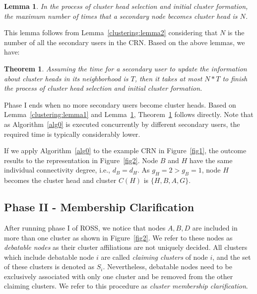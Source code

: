 \documentclass[times]{ettauth}
\theoremstyle{mytheoremstyle}
\newtheorem{theorem}{Theorem}[section]
\theoremstyle{mytheoremstyle}
\theoremstyle{mytheoremstyle}
\newtheorem{lemma}{Lemma}[section]
\begin{document}
\begin{lemma}
\label{clustering:lemma3}
In the process of cluster head selection and initial cluster formation, the maximum number of times that a secondary node becomes cluster head is $N$.
\end{lemma}
This lemma follows from Lemma~\ref{clustering:lemma2} considering that $N$ is the number of all the secondary users in the CRN.
Based on the above lemmas, we have:
\begin{theorem}
\label{clustering:theorem}
Assuming the time for a secondary user to update the information about cluster heads in its neighborhood is $T$, then it takes at most $N*T $ to finish the process of cluster head selection and initial cluster formation.
\end{theorem}
Phase I ends when no more secondary users become cluster heads.
Based on Lemma~\ref{clustering:lemma1} and Lemma~\ref{clustering:lemma3}, Theorem~\ref{clustering:theorem} follows directly.
Note that as Algorithm~\ref{alg0} is executed concurrently by different secondary users, the required time is typically considerably lower.

If we apply Algorithm~\ref{alg0} to the example CRN in Figure~\ref{fig1}, the outcome results to the representation in Figure~\ref{fig2}.
Node $B$ and $H$ have the same individual connectivity degree, i.e., $d_B=d_H$. As $g_H=2>g_B=1$, node $H$ becomes the cluster head and cluster $C(H)$ is $\{H, B, A, G\}$.


\subsection{Phase II - Membership Clarification}
\label{membershipClarification}
After running phase I of ROSS, we notice that nodes $A, B, D$ are included in more than one cluster as shown in Figure~\ref{fig2}. 
We refer to these nodes as \textit{debatable nodes} as their cluster affiliations are not uniquely decided.
All clusters which include debatable node $i$ are called \textit{claiming clusters} of node $i$, and the set of these clusters is denoted as $S_i$.  
Nevertheless, debatable nodes need to be exclusively associated with only one cluster and be removed from the other claiming clusters.
We refer to this procedure as \textit{cluster membership clarification}.
\end{document}

